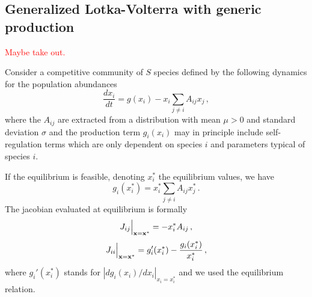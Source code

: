\documentclass[10pt]{article}
\begin{document}
\subsection{Generalized Lotka-Volterra with generic production}
\textcolor{red}{Maybe take out.}

Consider a competitive community of $S$ species
defined by the following dynamics for the population abundances
\begin{equation}
    \frac{dx_i}{dt}=g(x_i)-x_i\sum_{j\neq i}A_{ij}x_j \, ,
\end{equation}
where the $A_{ij}$ are extracted from a distribution
with mean $\mu>0$ and standard deviation $\sigma$ and
the production term $g_i(x_i)$ may in principle include
self-regulation terms which are only dependent on species $i$
and parameters typical of species $i$.

If the equilibrium is feasible, denoting $x_i^*$ the equilibrium values,
we have
\begin{equation}
    g_i(x_i^*)=x_i^*\sum_{j\neq i}A_{ij}x_j^* \, .
\end{equation}
The jacobian evaluated at equilibrium is formally
\begin{equation}
    J_{ij}\Big{|}_{\bf{x}=\bf{x}^*} = -x_i^*A_{ij} \, ,
\end{equation}
\begin{equation}
    J_{ii}\Big{|}_{\bf{x}=\bf{x}^*} =  g_i'(x_i^*)-\frac{g_i(x_i^*)}{x_i^*}\, ,
\end{equation}
where $g_i'(x_i^*)$ stands for $|d g_i(x_i)/d x_i|_{x_i=x_i^*}$ 
and we used the equilibrium relation.
\end{document}
